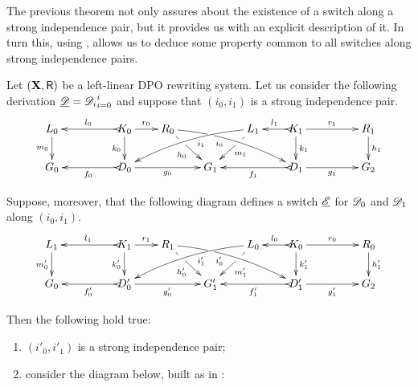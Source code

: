 The previous theorem not only assures about the existence of a switch along a strong independence pair, but it provides us with an explicit description of it. In turn this, using , allows us to deduce some property common to all switches along strong independence pairs.  

\begin{lemma}\label{cor:strongip}
	Let $(\textbf {\textup{X}}, \mathsf{R})$ be a left-linear DPO rewriting system. Let us consider the following derivation $\underline{\mathscr{D}}={\mathscr{D}_{i}}_{i=0}^i$ and suppose that $(i_0, i_1)$ is a strong independence pair.
	\[\xymatrix@R=20pt@C=20pt{L_0 \ar[d]_{m_0}&& K_0
		\ar[d]_{k_0}\ar@{>->}[ll]_{l_0} \ar[r]^{r_0} & R_0
		\ar@{>}@/^.25cm/[drrr]|(.32)\hole_(.4){i_0}
		\ar[dr]|(.33)\hole_{h_0} && L_1 \ar@{>}@/_.25cm/[dlll]^(.4){i_1}
		\ar[dl]|(.33)\hole^{m_1}& K_1 \ar[d]^{k_1}\ar@{>->}[l]_{l_1}
		\ar[rr]^{r_1} && R_1 \ar[d]^{h_1}\\G_0 && \ar@{>->}[ll]^{f_0}
		D_0 \ar[rr]_{g_0}&& G_1 && \ar@{>->}[ll]^{f_1} D_1
		\ar[rr]_{g_1}&& G_2}
	\]
	
	Suppose, moreover, that the following diagram defines a switch $\underline{\mathscr{E}}$ for $\mathscr{D}_0$ and $\mathscr{D}_1$ along $(i_0, i_1)$. 	
	\[
	\xymatrix@R=20pt@C=20pt{
		{L_1} \ar[d]_{m_0'}
		&&  {K_1} \ar@{>->}[ll]_{l_1} \ar[r]^{r_1} \ar[d]_{k_0'}
		&  {R_1} \ar[dr]|(.33)\hole_{h_0'}  \ar@/^.25cm/@{>}_(.4){i_0'}|(.32)\hole[drrr]
		& & 
		{L_0}\ar[dl]|(.33)\hole^{m_1'} \ar@/_.25cm/@{>}^(.4){i_1'}[dlll] 
		&  {K_0} \ar@{>->}[l]_{l_0} \ar[rr]^{r_0} \ar[d]^{k_1'}
		& & {R_0} \ar[d]^{h_1'} \\		
		{G_0}
		& & {D_0'} \ar@{>->}[ll]^{f_0'} \ar[rr]_{g_0'}
		& &  {G'_1} 
		& &  {D_1'} \ar@{>->}[ll]^{f_1'} \ar[rr]_{g_1'}
		& & {G_2}  }
	\]
	
	Then the following hold true:
	\begin{enumerate}
		\item $(i'_0, i'_1)$ is a strong independence pair;
		
		\item consider the diagram below, built as in :
		

\end{enumerate}
\end{lemma}
